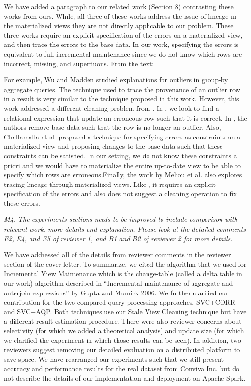 We have added a paragraph to our related work (Section 8) contrasting these works from ours. While, all three of these works address the issue of lineage in the materialized views they are not directly applicable to our problem. These three works require an explicit specification of the errors on a materialized view, and then trace the errors to the base data. In our work, specifying the errors is equivalent to full incremental maintenance since we do not know which rows are incorrect, missing, and superfluous. From the text:
\begin{displayquote}For example, Wu and Madden \cite{DBLP:journals/pvldb/0002M13} studied explanations for outliers in group-by aggregate queries. The technique used to trace the provenance of an outlier row in a result is very similar to the technique proposed in this work. However, this work addressed a different cleaning problem from \svc. In \svc, we look to find a relational expression that update an erroneous row such that it is correct. In \cite{DBLP:journals/pvldb/0002M13}, the authors remove base data such that the row is no longer an outlier. Also, Challamalla et al. \cite{DBLP:conf/sigmod/ChalamallaIOP14} proposed a technique for specifying errors as constraints on a materialized view and proposing changes to the base data such that these constraints can be satisfied.
In our setting, we do not know these constraints a priori and we would have to materialize the entire up-to-date view to be able to specify which rows are erroneous.Finally, the work by Meliou et al. \cite{DBLP:conf/sigmod/MeliouGNS11} also explores tracing lineage through materialized views. Like \cite{DBLP:journals/pvldb/0002M13}, it requires an explicit specification of the errors and also does not suggest a cleaning operation to fix these errors.\end{displayquote}

\vspace{1em}
\emph{M4. The experiments sections needs to be improved to include comparison with relevant work, more details and explanation. Please look at the detailed comments E2, E4, and E5 of reviewer 1, and B1 and B2 of reviewer 2 for more details. }

We have addressed all of the details from reviewer comments in the reviewer section of the cover letter. To summarize, we cited the algorithm that we used for Incremental View Maintenance which is the change-table (called a delta table in our work) algorithm described in “Incremental maintenance of aggregate and outerjoin expressions” by Gupta and Mumick 2006. We further clarified our contribution for the two compared query processing approaches, SVC+CORR and SVC+AQP. Both techniques use our Stale View Cleaning technique but have a different result estimation procedure. There were also reviewer concerns about selectivity (for which we added a theoretical analysis) and update size (for which we clarified the experiment in which those results can be seen).
In addition, two reviewers suggest removing our detailed evaluation on a distributed platform to save space. We have rearranged our experiments such that we still present accuracy and performance results for the real dataset from Conviva Inc. but do not describe the details of our implementation and deployment on Apache Spark.

